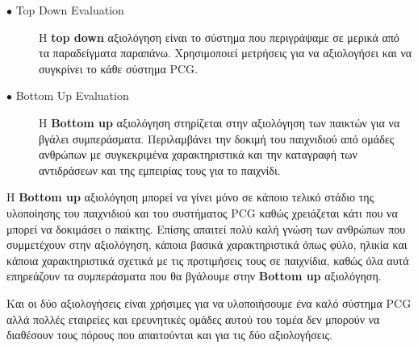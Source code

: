 \begin{description}
  \item[$\bullet$ Top Down Evaluation] Η \textbf{top down} αξιολόγηση είναι το σύστημα που περιγράψαμε σε μερικά από τα παραδείγματα παραπάνω. Χρησιμοποιεί μετρήσεις για να αξιολογήσει και να συγκρίνει το κάθε σύστημα PCG.
  \item[$\bullet$ Bottom Up Evaluation] Η \textbf{Bottom up} αξιολόγηση στηρίζεται στην αξιολόγηση των παικτών για να βγάλει συμπεράσματα. Περιλαμβάνει την δοκιμή του παιχνιδιού από ομάδες ανθρώπων με συγκεκριμένα χαρακτηριστικά και την καταγραφή των αντιδράσεων και της εμπειρίας τους για το παιχνίδι.
\end{description}
\par
Η \textbf{Bottom up} αξιολόγηση μπορεί να γίνει μόνο σε κάποιο τελικό στάδιο της υλοποίησης του παιχνιδιού και του συστήματος PCG καθώς χρειάζεται κάτι που να μπορεί να δοκιμάσει ο παίκτης. Επίσης απαιτεί πολύ καλή γνώση των ανθρώπων που συμμετέχουν στην αξιολόγηση, κάποια βασικά χαρακτηριστικά όπως φύλο, ηλικία και κάποια χαρακτηριστικά σχετικά με τις προτιμήσεις τους σε παιχνίδια, καθώς όλα αυτά επηρεάζουν τα συμπεράσματα που θα βγάλουμε στην \textbf{Bottom up} αξιολόγηση.
\par
Και οι δύο αξιολογήσεις είναι χρήσιμες για να υλοποιήσουμε ένα καλό σύστημα PCG αλλά πολλές εταιρείες και ερευνητικές ομάδες αυτού του τομέα δεν μπορούν να διαθέσουν τους πόρους που απαιτούνται και για τις δύο αξιολογήσεις.





